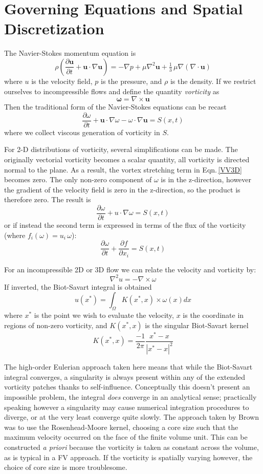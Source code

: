 \documentclass[]{aiaa-tc}%
\newcommand{\be}{\begin{equation}}
\newcommand{\ben}[1]{\begin{equation}\label{#1}}
\newcommand{\ee}{\end{equation}}
\begin{document}
\section{Governing Equations and Spatial Discretization}

The Navier-Stokes momentum equation is
 \be \rho \left(\frac{\partial \mathbf{u}}{\partial t} + \mathbf{u} \cdot \nabla \mathbf{u} \right) = -\nabla p + \mu \nabla^2 \mathbf u + \tfrac13 \, \mu \nabla (\nabla\cdot\mathbf{u}) \ee
where $u$ is the velocity field, $p$ is the pressure, and $\rho$ is the density. If we restrict ourselves to incompressible flows and define the quantity \textit{vorticity} as
\be \mathbf{\omega} = \nabla \times \mathbf{u} \ee
Then the traditional form of the Navier-Stokes equations can be recast
\ben{VV3D} \frac{\partial \omega}{\partial t} +  \mathbf{u} \cdot \nabla \omega - \omega \cdot \nabla  \mathbf{u} = S(x,t)\ee
where we collect viscous generation of vorticity in $S$.

For 2-D distributions of vorticity, several simplifications can be made. The originally vectorial vorticity becomes a scalar quantity, all vorticity is directed normal to the plane. As a result, the vortex stretching term in  Eqn.\,\eqref{VV3D} becomes zero. The only non-zero component of $\omega$ is in the z-direction, however the gradient of the velocity field is zero in the z-direction, so the product is therefore zero. The result is
\ben{VV2D} \frac{\partial \omega}{\partial t} + u \cdot \nabla \omega = S(x,t)\ee
or if instead the second term is expressed in terms of the flux of the vorticity (where $f_i(\omega)=u_i\,\omega$):
\ben{VV2DB} \frac{\partial \omega}{\partial t} + \frac{\partial f}{\partial x_i}= S(x,t)\ee

 For an incompressible 2D or 3D flow we can relate the velocity and vorticity by:
\be \nabla^2 u = -\nabla \times \omega \ee
If inverted, the Biot-Savart integral is obtained
\ben{BS} u(x^*) = \int_\Omega K(x^*,x) \times \omega(x) dx \ee
where $x^*$ is the point we wish to evaluate the velocity, $x$ is the coordinate in regions of non-zero vorticity, and $K(x^*,x)$ is the singular Biot-Savart kernel \cite{BealeMajda}
\ben{BSkern} K(x^*,x) = \frac{-1}{2 \pi} \frac{x^*-x}{|x^*-x|^2} \ee

The high-order Eulerian approach taken here means that while the Biot-Savart integral converges, a singularity is always present within any of the extended vorticity patches thanks to self-influence. Conceptually this doesn't present an impossible problem, the integral \textit{does} converge in an analytical sense; practically speaking however a singularity may cause numerical integration procedures to diverge, or at the very least converge quite slowly. The approach taken by Brown \cite{Brown2004} was to use the Rosenhead-Moore kernel, choosing a core size such that the maximum velocity occurred on the face of the finite volume unit. This can be constructed \textit{a priori} because the vorticity is taken as constant across the volume, as is typical in a FV approach. If the vorticity is spatially varying however, the choice of core size is more troublesome.
\end{document}
